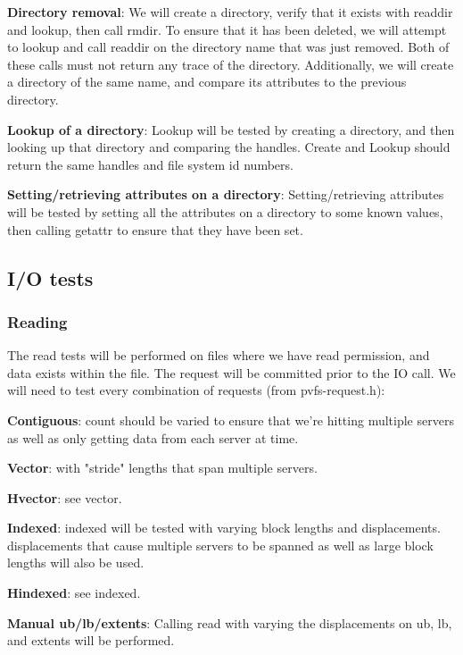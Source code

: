 \documentclass[12pt]{article} %
\begin{document}
\begin{list}{.}{}
\item \textbf{Directory removal}:  We will create a directory, verify that it exists with readdir and lookup, then call rmdir.  To ensure that it has been deleted, we will attempt to lookup and call readdir on the directory name that was just removed.  Both of these calls must not return any trace of the directory.  Additionally, we will create a directory of the same name, and compare its attributes to the previous directory.

\item \textbf{Lookup of a directory}:  Lookup will be tested by creating a directory, and then looking up that directory and comparing the handles.  Create and Lookup should return the same handles and file system id numbers.

\item \textbf{Setting/retrieving attributes on a directory}:  Setting/retrieving attributes will be tested by setting all the attributes on a directory to some known values, then calling getattr to ensure that they have been set.
\end{list}

\subsection{I/O tests}

\subsubsection{Reading}
The read tests will be performed on files where we have read permission, and data exists within the file.  The request will be committed prior to the IO call.  We will need to test every combination of requests (from pvfs-request.h):

\begin{list}{.}{}
\item \textbf{Contiguous}:  count should be varied to ensure that we're hitting multiple servers as well as only getting data from each server at time.
\item \textbf{Vector}: with "stride" lengths that span multiple servers.
\item \textbf{Hvector}:  see vector.
\item \textbf{Indexed}:  indexed will be tested with varying block lengths and displacements.  displacements that cause multiple servers to be spanned as well as large block lengths will also be used.
\item \textbf{Hindexed}:  see indexed.
\item \textbf{Manual ub/lb/extents}:  Calling read with varying the displacements on ub, lb, and extents will be performed.
\end{list}
\end{document}
